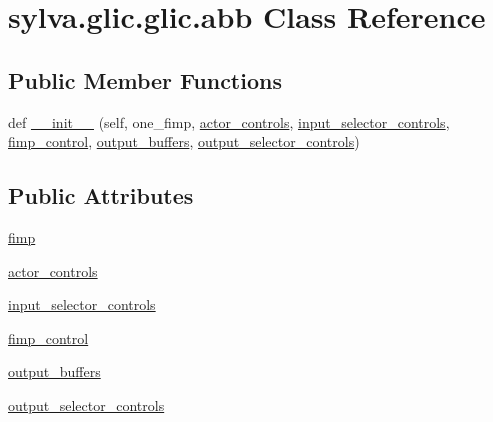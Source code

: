 \hypertarget{classsylva_1_1glic_1_1glic_1_1abb}{}\section{sylva.\+glic.\+glic.\+abb Class Reference}
\label{classsylva_1_1glic_1_1glic_1_1abb}
\subsection*{Public Member Functions}
\begin{DoxyCompactItemize}
\item 
def \hyperlink{classsylva_1_1glic_1_1glic_1_1abb_aa11318390c0aca19b3960f881322cf2e}{\+\_\+\+\_\+init\+\_\+\+\_\+} (self, one\+\_\+fimp, \hyperlink{classsylva_1_1glic_1_1glic_1_1abb_af1bb5befe94a609998e4d1b2d5c3fa5c}{actor\+\_\+controls}, \hyperlink{classsylva_1_1glic_1_1glic_1_1abb_af982f58cc9fe5957f377cadf182bb572}{input\+\_\+selector\+\_\+controls}, \hyperlink{classsylva_1_1glic_1_1glic_1_1abb_a502b08f5b7db44bafae7e3580db67eae}{fimp\+\_\+control}, \hyperlink{classsylva_1_1glic_1_1glic_1_1abb_ade94ea67f10ccd0e22612d2838ade594}{output\+\_\+buffers}, \hyperlink{classsylva_1_1glic_1_1glic_1_1abb_a95b94a4b182e665ff3267b07c8d4e5ca}{output\+\_\+selector\+\_\+controls})
\end{DoxyCompactItemize}
\subsection*{Public Attributes}
\begin{DoxyCompactItemize}
\item 
\hyperlink{classsylva_1_1glic_1_1glic_1_1abb_aa95718bffcb426bb92909562e4de2e70}{fimp}
\item 
\hyperlink{classsylva_1_1glic_1_1glic_1_1abb_af1bb5befe94a609998e4d1b2d5c3fa5c}{actor\+\_\+controls}
\item 
\hyperlink{classsylva_1_1glic_1_1glic_1_1abb_af982f58cc9fe5957f377cadf182bb572}{input\+\_\+selector\+\_\+controls}
\item 
\hyperlink{classsylva_1_1glic_1_1glic_1_1abb_a502b08f5b7db44bafae7e3580db67eae}{fimp\+\_\+control}
\item 
\hyperlink{classsylva_1_1glic_1_1glic_1_1abb_ade94ea67f10ccd0e22612d2838ade594}{output\+\_\+buffers}
\item 
\hyperlink{classsylva_1_1glic_1_1glic_1_1abb_a95b94a4b182e665ff3267b07c8d4e5ca}{output\+\_\+selector\+\_\+controls}
\end{DoxyCompactItemize}


